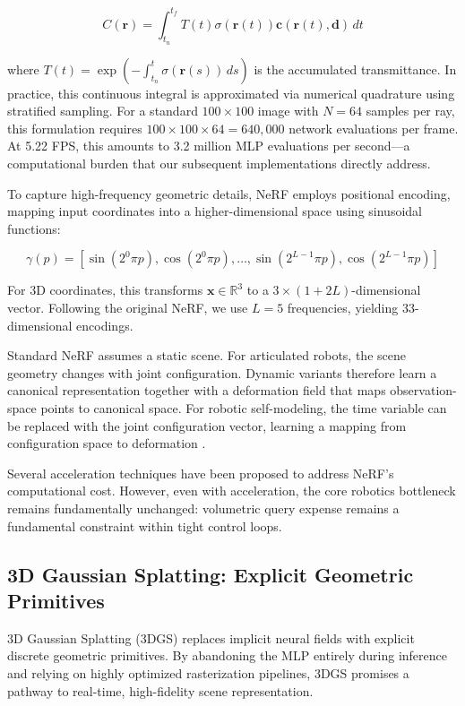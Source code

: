﻿\documentclass[12pt,a4paper,oneside]{report}
\begin{document}
\begin{equation}
C(\mathbf{r}) = \int_{t_n}^{t_f} T(t) \sigma(\mathbf{r}(t)) \mathbf{c}(\mathbf{r}(t), \mathbf{d}) \, dt
\end{equation}

where $T(t) = \exp\left(-\int_{t_n}^{t} \sigma(\mathbf{r}(s)) \, ds\right)$ is the accumulated transmittance. In practice, this continuous integral is approximated via numerical quadrature using stratified sampling. For a standard $100 \times 100$ image with $N = 64$ samples per ray, this formulation requires $100 \times 100 \times 64 = 640,000$ network evaluations per frame. At 5.22 FPS, this amounts to 3.2 million MLP evaluations per second---a computational burden that our subsequent implementations directly address.

To capture high-frequency geometric details, NeRF employs positional encoding, mapping input coordinates into a higher-dimensional space using sinusoidal functions:

\begin{equation}
\gamma(p) = [\sin(2^0 \pi p), \cos(2^0 \pi p), \ldots, \sin(2^{L-1} \pi p), \cos(2^{L-1} \pi p)]
\end{equation}

For 3D coordinates, this transforms $\mathbf{x} \in \mathbb{R}^3$ to a $3 \times (1 + 2L)$-dimensional vector. Following the original NeRF, we use $L = 5$ frequencies, yielding 33-dimensional encodings.

Standard NeRF assumes a static scene. For articulated robots, the scene geometry changes with joint configuration. Dynamic variants therefore learn a canonical representation together with a deformation field that maps observation-space points to canonical space. For robotic self-modeling, the time variable can be replaced with the joint configuration vector, learning a mapping from configuration space to deformation \cite{hu2024teaching}.

Several acceleration techniques have been proposed to address NeRF's computational cost. However, even with acceleration, the core robotics bottleneck remains fundamentally unchanged: volumetric query expense remains a fundamental constraint within tight control loops.

\subsection{3D Gaussian Splatting: Explicit Geometric Primitives}

3D Gaussian Splatting (3DGS) replaces implicit neural fields with explicit discrete geometric primitives. By abandoning the MLP entirely during inference and relying on highly optimized rasterization pipelines, 3DGS promises a pathway to real-time, high-fidelity scene representation.
\end{document}
